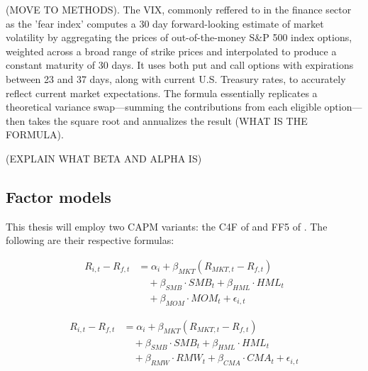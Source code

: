 (MOVE TO METHODS). The VIX, commonly reffered to in the finance sector as the 'fear index' computes a 30 day forward-looking estimate of market volatility by aggregating the prices of out-of-the-money S\&P 500 index options, weighted across a broad range of strike prices and interpolated to produce a constant maturity of 30 days. It uses both put and call options with expirations between 23 and 37 days, along with current U.S. Treasury rates, to accurately reflect current market expectations. The formula essentially replicates a theoretical variance swap—summing the contributions from each eligible option—then takes the square root and annualizes the result (WHAT IS THE FORMULA). 

(EXPLAIN WHAT BETA AND ALPHA IS)


\subsection{Factor models}
This thesis will employ two CAPM variants: the C4F of  and FF5 of . The following are their respective formulas:

\begin{equation}
    \label{eq:c4f}
    \begin{split}
        R_{i,t} - R_{f,t} &= \alpha_i + \beta_{MKT} (R_{MKT,t} - R_{f,t}) \\
        &\quad + \beta_{SMB} \cdot SMB_t + \beta_{HML} \cdot HML_t \\
        &\quad + \beta_{MOM} \cdot MOM_t + \epsilon_{i,t}
    \end{split}
\end{equation}

\begin{equation}
    \label{eq:ff5}
    \begin{split}
        R_{i,t} - R_{f,t} &= \alpha_i + \beta_{MKT} (R_{MKT,t} - R_{f,t}) \\
        &\quad + \beta_{SMB} \cdot SMB_t + \beta_{HML} \cdot HML_t \\
        &\quad + \beta_{RMW} \cdot RMW_t + \beta_{CMA} \cdot CMA_t + \epsilon_{i,t}
    \end{split}
\end{equation}

